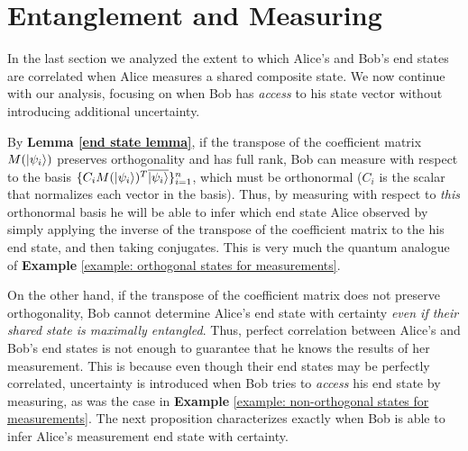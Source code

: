 \pagebreak

\section{Entanglement and Measuring}
In the last section we analyzed the extent to which Alice's and Bob's end states are correlated when Alice measures a shared composite state. We now continue with our analysis, focusing on when Bob has {\emph{access}} to his state vector without introducing additional uncertainty. 

By \textbf{Lemma \ref{end state lemma}}, if the transpose of the coefficient matrix $M(\ket{\psi_i})$ preserves orthogonality and has full rank, Bob can measure with respect to the basis $\{C_i M(\ket{\psi_i})^T \overline{\ket{\psi_i}}\}_{i=1}^n$, which must be orthonormal ($C_i$ is the scalar that normalizes each vector in the basis). Thus, by measuring with respect to {\emph{this}} orthonormal basis he will be able to infer which end state Alice observed by simply applying the inverse of the transpose of the coefficient matrix to the his end state, and then taking conjugates. This is very much the quantum analogue of {\bf{Example}} \ref{example: orthogonal states for measurements}.

On the other hand, if the transpose of the coefficient matrix does not preserve orthogonality, Bob cannot determine Alice's end state with certainty {\emph{even if their shared state is maximally entangled}}.  Thus, perfect correlation between Alice's and Bob's end states is not enough to guarantee that he knows the results of her measurement.  This is because even though their end states may be perfectly correlated, uncertainty is introduced when Bob tries to {\emph{access}} his end state by measuring, as was the case in {\bf{Example}} \ref{example: non-orthogonal states for measurements}.  The next proposition characterizes exactly when Bob is able to infer Alice's measurement end state with certainty.  

